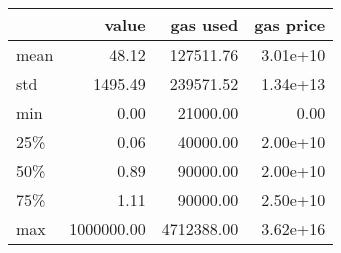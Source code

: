 \begin{tabular}{lrrr}
\toprule
{}    &       value &    gas used &     gas price \\
\midrule
mean  &       48.12 &   127511.76 &  3.01e+10 \\
std   &     1495.49 &   239571.52 &  1.34e+13 \\
min   &        0.00 &    21000.00 &  0.00     \\
25\%  &        0.06 &    40000.00 &  2.00e+10 \\
50\%  &        0.89 &    90000.00 &  2.00e+10 \\
75\%  &        1.11 &    90000.00 &  2.50e+10 \\
max   &  1000000.00 &  4712388.00 &  3.62e+16 \\
\bottomrule
\end{tabular}
